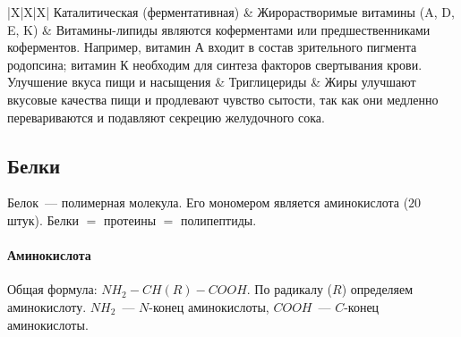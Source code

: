 \documentclass[12pt]{article}
\begin{document}
\begin{xltabular}{\textwidth}{|X|X|X|}
		\hline
		Каталитическая (ферментативная)	& Жирорастворимые витамины (A, D, E, K) & Витамины-липиды являются коферментами или предшественниками коферментов. Например, витамин А входит в состав зрительного пигмента родопсина; витамин К необходим для синтеза факторов свертывания крови.\\
		\hline
		Улучшение вкуса пищи и насыщения & Триглицериды & Жиры улучшают вкусовые качества пищи и продлевают чувство сытости, так как они медленно перевариваются и подавляют секрецию желудочного сока.\\
		\hline
	\end{xltabular}
	\subsection{Белки}
	Белок~--- полимерная молекула. Его мономером является аминокислота ($20$ штук). Белки $=$ протеины $=$ полипептиды.
	\paragraph{Аминокислота} Общая формула: $NH_2 - CH (R) - COOH$. По радикалу ($R$) определяем аминокислоту. $NH_2$~--- $N$-конец аминокислоты, $COOH$~--- $C$-конец аминокислоты.\\
\end{document}
